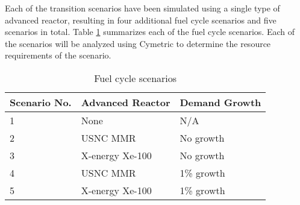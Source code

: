 Each of the transition scenarios have been simulated using a single type of 
advanced reactor, resulting in four additional fuel cycle scenarios and five 
scenarios in total. Table \ref{tab:scenarios} summarizes each of the fuel 
cycle scenarios. Each of the scenarios will be analyzed using Cymetric
\cite{scopatz_cymetric_2015} to determine the resource requirements of the 
scenario. 

\begin{table}[ht]
    \caption{Fuel cycle scenarios}
    \label{tab:scenarios}
    \begin{tabular}{p{2cm}p{3cm}p{2.5cm}}
        \hline
        Scenario No. & Advanced Reactor & Demand Growth \\\hline
        1 & None & N/A \\
        2 & \gls{USNC} \gls{MMR} & No growth \\
        3 & X-energy Xe-100 & No growth \\
        4 & \gls{USNC} \gls{MMR} & 1\% growth\\
        5 & X-energy Xe-100 & 1\% growth\\
        \hline
    \end{tabular}
\end{table}